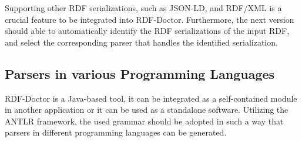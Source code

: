 Supporting other RDF serializations, such as JSON-LD, and RDF/XML is a crucial feature to be integrated into RDF-Doctor. 
Furthermore, the next version should able to automatically identify the RDF serializations of the input RDF, and select the corresponding parser that handles the identified serialization.     

\subsection{Parsers in various Programming Languages}

RDF-Doctor is a  Java-based tool, it can be integrated as a self-contained module in another application or it can be used as a standalone software.  
Utilizing the ANTLR framework, the used grammar should be adopted in such a way that parsers in different programming languages can be generated.%

